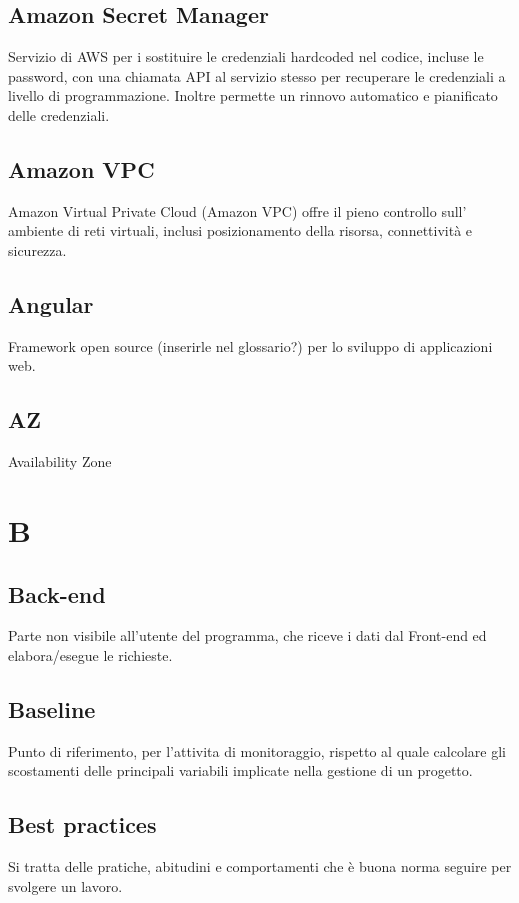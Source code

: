 \documentclass{classes/base}
\begin{document}
        \subsection*{Amazon Secret Manager}
        Servizio di AWS per i sostituire le credenziali hardcoded nel codice, incluse le password, con una chiamata API al servizio stesso per recuperare le credenziali a livello di programmazione. Inoltre permette un rinnovo automatico e pianificato delle credenziali.

        \subsection*{Amazon VPC}
        Amazon Virtual Private Cloud (Amazon VPC) offre il pieno controllo sull' ambiente di reti virtuali, inclusi posizionamento della risorsa, connettività e sicurezza.

        \subsection*{Angular} 
        Framework open source (inserirle nel glossario?) per lo sviluppo di applicazioni web.

        \subsection*{AZ}
        Availability Zone
    
        \newpage  
    \section{B}
    
    	\subsection*{Back-end}
    	Parte non visibile all'utente del programma, che riceve i dati dal Front-end ed elabora/esegue le richieste.
    
    	\subsection*{Baseline}
    	Punto di riferimento, per l'attivita di monitoraggio, rispetto al quale calcolare gli scostamenti delle principali variabili implicate nella gestione di un progetto.
        
        \subsection*{Best practices} 
        Si tratta delle pratiche, abitudini e comportamenti che è buona norma seguire per svolgere un lavoro.
\end{document}
